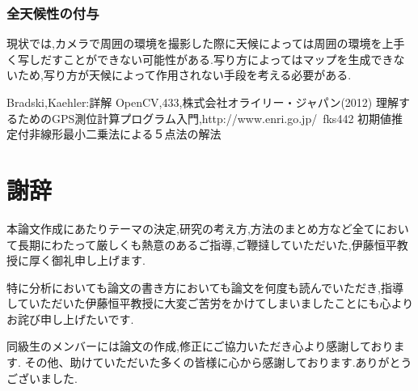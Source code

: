 \documentclass[12pt,oneside]{sotsuken_paper}
\begin{document}
\subsection{全天候性の付与}
現状では,カメラで周囲の環境を撮影した際に天候によっては周囲の環境を上手く写しだすことができない可能性がある.写り方によってはマップを生成できないため,写り方が天候によって作用されない手段を考える必要がある.

\begin{thebibliography}{8}
 Bradski,Kaehler:詳解 OpenCV,433,株式会社オライリー・ジャパン(2012)
 理解するためのGPS測位計算プログラム入門,http://www.enri.go.jp/~fks442%
 初期値推定付非線形最小二乗法による５点法の解法
\end{thebibliography}



\chapter*{謝辞}
本論文作成にあたりテーマの決定,研究の考え方,方法のまとめ方など全てにおいて長期にわたって厳しくも熱意のあるご指導,ご鞭撻していただいた,伊藤恒平教授に厚く御礼申し上げます.


特に分析においても論文の書き方においても論文を何度も読んでいただき,指導していただいた伊藤恒平教授に大変ご苦労をかけてしまいましたことにも心よりお詫び申し上げたいです.


同級生のメンバーには論文の作成,修正にご協力いただき心より感謝しております.
その他、助けていただいた多くの皆様に心から感謝しております.ありがとうございました.
\end{document}
